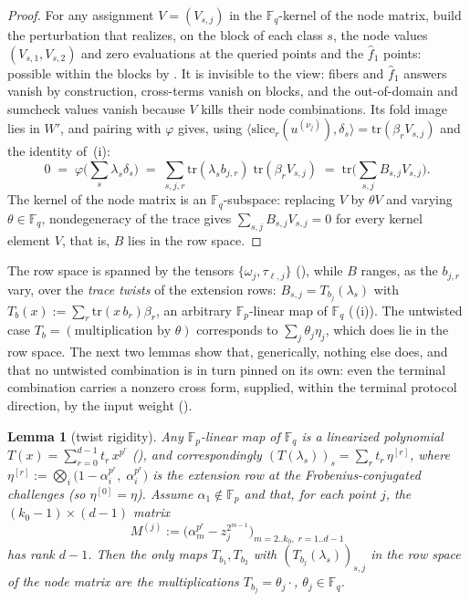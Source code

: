 \documentclass{article}
\newcommand{\Fp}{\mathbb{F}_p}
\newcommand{\Fq}{\mathbb{F}_q}
\newcommand{\extdeg}{d}
\newtheorem{lemma}[theorem]{Lemma}
\theoremstyle{definition}
\begin{document}
\begin{proof}
For any assignment $V = (V_{s,j})$ in the $\Fq$-kernel of the node matrix, build the perturbation that realizes, on the block of each class $s$, the node values $(V_{s,1}, V_{s,2})$ and zero evaluations at the queried points and the $\hat{f}_1$ points: possible within the blocks by . It is invisible to the view: fibers and $\hat{f}_1$ answers vanish by construction, cross-terms vanish on blocks, and the out-of-domain and sumcheck values vanish because $V$ kills their node combinations. Its fold image lies in $W'$, and pairing with $\varphi$ gives, using $\langle \mathrm{slice}_r(u^{(\nu_j)}), \delta_s \rangle = \mathrm{tr}(\beta_r V_{s,j})$ and the identity of \,(i):
\[
0 \;=\; \varphi\Big(\sum_s \lambda_s \delta_s\Big) \;=\; \sum_{s, j, r} \mathrm{tr}(\lambda_s b_{j,r})\; \mathrm{tr}(\beta_r V_{s,j}) \;=\; \mathrm{tr}\Big( \sum_{s,j} B_{s,j} V_{s,j} \Big) .
\]
The kernel of the node matrix is an $\Fq$-subspace: replacing $V$ by $\theta V$ and varying $\theta \in \Fq$, nondegeneracy of the trace gives $\sum_{s,j} B_{s,j} V_{s,j} = 0$ for every kernel element $V$, that is, $B$ lies in the row space.
\end{proof}

The row space is spanned by the tensors $\{\omega_j, \tau_{\ell, j}\}$ (), while $B$ ranges, as the $b_{j,r}$ vary, over the \emph{trace twists} of the extension rows: $B_{s,j} = T_{b_j}(\lambda_s)$ with $T_b(x) := \sum_r \mathrm{tr}(x\, b_r) \beta_r$, an arbitrary $\Fp$-linear map of $\Fq$ (\,(i)). The untwisted case $T_b = (\text{multiplication by } \theta)$ corresponds to $\sum_j \theta_j \eta_j$, which does lie in the row space. The next two lemmas show that, generically, nothing else does, and that no untwisted combination is in turn pinned on its own: even the terminal combination carries a nonzero cross form, supplied, within the terminal protocol direction, by the input weight ().

\begin{lemma}[twist rigidity]\label{cond:twist}
Any $\Fp$-linear map of $\Fq$ is a linearized polynomial $T(x) = \sum_{r=0}^{\extdeg-1} t_r\, x^{p^r}$ (), and correspondingly $(T(\lambda_s))_s = \sum_r t_r\, \eta^{[r]}$, where $\eta^{[r]} := \bigotimes_i \big(1 - \alpha_i^{p^r},\; \alpha_i^{p^r}\big)$ is the extension row at the Frobenius-conjugated challenges (so $\eta^{[0]} = \eta$). Assume $\alpha_1 \notin \Fp$ and that, for each point $j$, the $(k_0 - 1) \times (\extdeg - 1)$ matrix
\[
M^{(j)} := \Big( \alpha_m^{p^r} - z_j^{2^{m-1}} \Big)_{m = 2..k_0,\; r = 1..\extdeg - 1}
\]
has rank $\extdeg - 1$. Then the only maps $T_{b_1}, T_{b_2}$ with $(T_{b_j}(\lambda_s))_{s,j}$ in the row space of the node matrix are the multiplications $T_{b_j} = \theta_j \cdot$, $\theta_j \in \Fq$.
\end{lemma}
\end{document}
